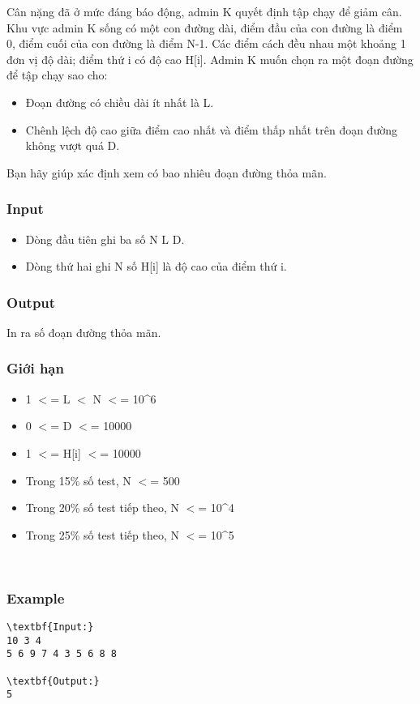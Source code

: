 

Cân nặng đã ở mức đáng báo động, admin K quyết định tập chạy để giảm cân. Khu vực admin K sống có một con đường dài, điểm đầu của con đường là điểm 0, điểm cuối của con đường là điểm N-1. Các điểm cách đều nhau một khoảng 1 đơn vị độ dài; điểm thứ i có độ cao H[i]. Admin K muốn chọn ra một đoạn đường để tập chạy sao cho:
\begin{itemize}
	\item Đoạn đường có chiều dài ít nhất là L.
	\item Chênh lệch độ cao giữa điểm cao nhất và điểm thấp nhất trên đoạn đường không vượt quá D.
\end{itemize}

Bạn hãy giúp xác định xem có bao nhiêu đoạn đường thỏa mãn.

\subsubsection{Input}
\begin{itemize}
	\item Dòng đầu tiên ghi ba số N L D.
	\item Dòng thứ hai ghi N số H[i] là độ cao của điểm thứ i.
\end{itemize}

\subsubsection{Output}

In ra số đoạn đường thỏa mãn.

\subsubsection{Giới hạn}
\begin{itemize}
	\item 1 $<$= L $<$ N $<$= 10\textasciicircum6
	\item 0 $<$= D $<$= 10000
	\item 1 $<$= H[i] $<$= 10000
	\item Trong 15\% số test, N $<$= 500
	\item Trong 20\% số test tiếp theo, N $<$= 10\textasciicircum4
	\item Trong 25\% số test tiếp theo, N $<$= 10\textasciicircum5
\end{itemize}

 

\subsubsection{Example}
\begin{verbatim}
\textbf{Input:}
10 3 4
5 6 9 7 4 3 5 6 8 8

\textbf{Output:}
5\end{verbatim}